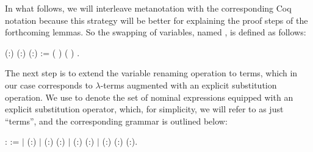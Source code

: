 In what follows, we will interleave metanotation with the corresponding Coq notation because this strategy will be better for explaining the proof steps of the forthcoming lemmas. So the swapping of variables, named , is defined as follows: 
\begin{coqdoccode}
\coqdocemptyline
\coqdocnoindent
{}  (:) (:) (:) :=  ( \coqdocnotation{==} )     ( \coqdocnotation{==} )    .\coqdoceol
\coqdocemptyline
\coqdocemptyline
\end{coqdoccode}
The next step is to extend the variable renaming operation to terms, which in our case corresponds to $\lambda$-terms augmented with an explicit substitution operation. We use  to denote the set of nominal expressions equipped with an explicit substitution operator, which, for simplicity, we will refer to as just ``terms'', and the corresponding grammar is outlined below: 
\begin{coqdoccode}
\coqdocemptyline
\coqdocnoindent
{}  :  :=\coqdoceol
\coqdocindent{0.50em}
\ensuremath{|}  (:)\coqdoceol
\coqdocindent{0.50em}
\ensuremath{|}  (:) (:)\coqdoceol
\coqdocindent{0.50em}
\ensuremath{|}  (:) (:)\coqdoceol
\coqdocindent{0.50em}
\ensuremath{|}  (:) (:) (:).\coqdoceol
\coqdocemptyline
\end{coqdoccode}
